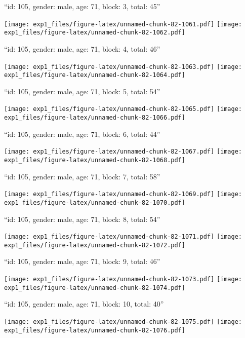 \documentclass[11pt,,]{article}
\begin{document}
\newpage
[1] 

``id: 105, gender: male, age: 71, block: 3, total: 45''

\texttt{[image: exp1\_files/figure-latex/unnamed-chunk-82-1061.pdf]}
\texttt{[image: exp1\_files/figure-latex/unnamed-chunk-82-1062.pdf]}

\newpage
[1] 

``id: 105, gender: male, age: 71, block: 4, total: 46''

\texttt{[image: exp1\_files/figure-latex/unnamed-chunk-82-1063.pdf]}
\texttt{[image: exp1\_files/figure-latex/unnamed-chunk-82-1064.pdf]}

\newpage
[1] 

``id: 105, gender: male, age: 71, block: 5, total: 54''

\texttt{[image: exp1\_files/figure-latex/unnamed-chunk-82-1065.pdf]}
\texttt{[image: exp1\_files/figure-latex/unnamed-chunk-82-1066.pdf]}

\newpage
[1] 

``id: 105, gender: male, age: 71, block: 6, total: 44''

\texttt{[image: exp1\_files/figure-latex/unnamed-chunk-82-1067.pdf]}
\texttt{[image: exp1\_files/figure-latex/unnamed-chunk-82-1068.pdf]}

\newpage
[1] 

``id: 105, gender: male, age: 71, block: 7, total: 58''

\texttt{[image: exp1\_files/figure-latex/unnamed-chunk-82-1069.pdf]}
\texttt{[image: exp1\_files/figure-latex/unnamed-chunk-82-1070.pdf]}

\newpage
[1] 

``id: 105, gender: male, age: 71, block: 8, total: 54''

\texttt{[image: exp1\_files/figure-latex/unnamed-chunk-82-1071.pdf]}
\texttt{[image: exp1\_files/figure-latex/unnamed-chunk-82-1072.pdf]}

\newpage
[1] 

``id: 105, gender: male, age: 71, block: 9, total: 46''

\texttt{[image: exp1\_files/figure-latex/unnamed-chunk-82-1073.pdf]}
\texttt{[image: exp1\_files/figure-latex/unnamed-chunk-82-1074.pdf]}

\newpage
[1] 

``id: 105, gender: male, age: 71, block: 10, total: 40''

\texttt{[image: exp1\_files/figure-latex/unnamed-chunk-82-1075.pdf]}
\texttt{[image: exp1\_files/figure-latex/unnamed-chunk-82-1076.pdf]}
\end{document}
